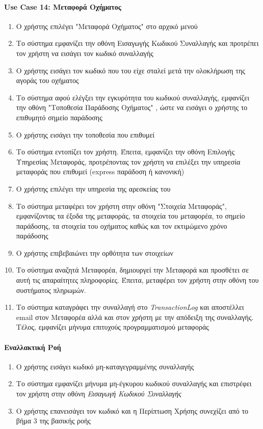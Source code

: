 \documentclass{../ol-softwaremanual}
\begin{document}
	\paragraph{\en Use Case 14: \gr Μεταφορά Οχήματος}  
	\begin{enumerate}
		\item Ο χρήστης επιλέγει \en"\gr Μεταφορά Οχήματος\en" \gr στο αρχικό μενού
		\item Το σύστημα εμφανίζει την οθόνη Εισαγωγής Κωδικού Συναλλαγής και προτρέπει τον χρήστη να εισάγει τον κωδικό συναλλαγής
		\item Ο χρήστης εισάγει τον κωδικό που του είχε σταλεί μετά την ολοκλήρωση της αγοράς του οχήματος
		\item Το σύστημα αφού ελέγξει την εγκυρότητα του κωδικού συναλλαγής, εμφανίζει την οθόνη \en"\gr Τοποθεσία Παράδοσης Οχήματος\en" \gr, ώστε να εισάγει ο χρήστης το επιθυμητό σημείο παράδοσης
		\item Ο χρήστης εισάγει την τοποθεσία που επιθυμεί
		\item Το σύστημα εντοπίζει τον χρήστη. Έπειτα, εμφανίζει την οθόνη Επιλογής Υπηρεσίας Μεταφοράς, προτρέποντας τον χρήστη να επιλέξει την υπηρεσία μεταφοράς που επιθυμεί (\en express \gr παράδοση ή κανονική)		
		\item Ο χρήστης επιλέγει την υπηρεσία της αρεσκείας του
		\item Το σύστημα μεταφέρει τον χρήστη στην οθόνη \en"\gr Στοιχεία Μεταφοράς\en"\gr, εμφανίζοντας τα έξοδα της μεταφοράς, τα στοιχεία του μεταφορέα, το σημείο παράδοσης, τα στοιχεία του οχήματος καθώς και τον εκτιμώμενο χρόνο παράδοσης 
		\item Ο χρήστης επιβεβαιώνει την ορθότητα των στοιχείων 
		\item Το σύστημα αναζητά Μεταφορέα, δημιουργεί την Μεταφορά και προσθέτει σε αυτή τις απαραίτητες πληροφορίες. Έπειτα, μεταφέρει τον χρήστη στην οθόνη του συστήματος πληρωμών.
		\item Το σύστημα καταγράφει την συναλλαγή στο \en \textit{TransactionLog} \gr	και αποστέλλει \en email \gr στον Μεταφορέα αλλά και στον χρήστη με την απόδειξη της συναλλαγής. Τέλος, εμφανίζει μήνυμα επιτυχούς προγραμματισμού μεταφοράς
	\end{enumerate}
	
	\paragraph{Εναλλακτική Ροή}
	\begin{enumerate}
		\item Ο χρήστης εισάγει κωδικό μη-καταγεγραμμένης συναλλαγής
		\item Το σύστημα εμφανίζει μήνυμα μη-έγκυρου κωδικού συναλλαγής και επιστρέφει τον χρήστη στην οθόνη \textit{Εισαγωγή Κωδικού Συναλλαγής} 
		\item Ο χρήστης επανεισάγει τον κωδικό και η Περίπτωση Χρήσης συνεχίζει από το βήμα 3 της βασικής ροής
	\end{enumerate}
	
\end{document}
